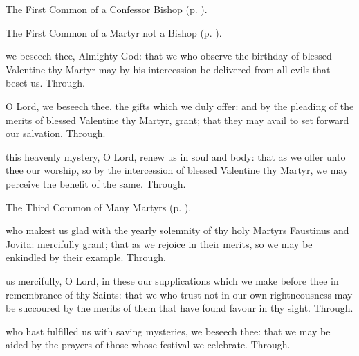 \begin{rubric}
	The First Common of a Confessor Bishop (p. \pageref{CommonConfessorBishopI}).
\end{rubric}



\begin{rubric}
	The First Common of a Martyr not a Bishop (p. \pageref{CommonMartyrNotBishopI}).
\end{rubric}

\collect
{} we beseech thee, Almighty God: that we who observe the birthday of blessed Valentine thy Martyr may by his intercession be delivered from all evils that beset us. Through.

\secret
{} O Lord, we beseech thee, the gifts which we duly offer: and by the pleading of the merits of blessed Valentine thy Martyr, grant; that they may avail to set forward our salvation. Through.

\postcommunion
{} this heavenly mystery, O Lord, renew us in soul and body: that as we offer unto thee our worship, so by the intercession of blessed Valentine thy Martyr, we may perceive the benefit of the same. Through.


\clearpage
{}

\begin{rubric}
	The Third Common of Many Martyrs (p. \pageref{CommonMartyrsIII}).
\end{rubric}

\collect
{} who makest us glad with the yearly solemnity of thy holy Martyrs Faustinus and Jovita: mercifully grant; that as we rejoice in their merits, so we may be enkindled by their example. Through.

\secret
{} us mercifully, O Lord, in these our supplications which we make before thee in remembrance of thy Saints: that we who trust not in our own rightneousness may be succoured by the merits of them that have found favour in thy sight. Through.

\postcommunion
{} who hast fulfilled us with saving mysteries, we beseech thee: that we may be aided by the prayers of those whose festival we celebrate. Through.



